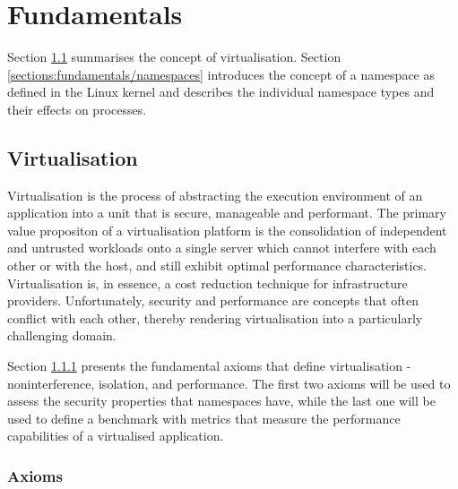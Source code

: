 \chapter{Fundamentals}
\label{ch:fundamentals}

Section \ref{sections:fundamentals/virtualisation} summarises the concept of virtualisation.
Section \ref{sections:fundamentals/namespaces} introduces the concept of a namespace as defined 
in the Linux kernel and describes the individual namespace types and their effects on processes. 

\section{Virtualisation}
\label{sections:fundamentals/virtualisation}
Virtualisation is the process of abstracting the execution environment of an application into 
a unit that is secure, manageable and performant. The primary value propositon of a virtualisation 
platform is the consolidation of independent and untrusted workloads onto a single 
server which cannot interfere with each other or with the host, and still exhibit optimal 
performance characteristics. Virtualisation is, in essence, a cost reduction technique for 
infrastructure providers. Unfortunately, security and performance are concepts that often conflict 
with each other, thereby rendering virtualisation into a particularly challenging domain.

Section \ref{sections:fundamentals/virtualisation/axioms} presents the fundamental axioms 
that define virtualisation - noninterference, isolation, and performance.
The first two axioms will be used to assess the security properties
that namespaces have, while the last one will be used to define a benchmark with metrics that 
measure the performance capabilities of a virtualised application. 

\subsection{Axioms}
\label{sections:fundamentals/virtualisation/axioms}
